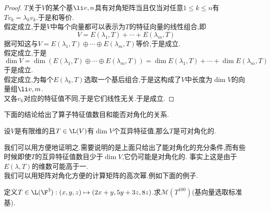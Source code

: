 \documentclass{ctexart}
\begin{document}
\begin{proof}
    $T$关于$V$的某个基$\li v,n$具有对角矩阵当且仅当对任意$1\leqslant k\leqslant n$有$Tv_k=\lambda_kv_k$.于是和等价.\\
    假定成立,于是$V$中每个向量都可以表示为$T$的特征向量的线性组合,即
    $$V=E(\lambda_1,T)+\cdots+E(\lambda_m,T)$$
    据可知这与$V=E(\lambda_1,T)\oplus\cdots\oplus E(\lambda_m,T)$等价,于是成立.\\
    假定成立,于是
    $$\dim V=\dim(E(\lambda_1,T)\oplus\cdots\oplus E(\lambda_m,T))=\dim E(\lambda_1,T)+\cdots+\dim E(\lambda_m,T)$$
    于是成立.\\
    假定成立,为每个$E(\lambda_k,T)$选取一个基后组合,于是这构成了$V$中长度为$\dim V$的向量组$\li v,m$.\\
    又各$v_k$对应的特征值不同,于是它们线性无关.于是成立.
\end{proof}\noindent
下面的结论给出了算子特征值数目和能否对角化的关系.
\begin{formal}[2.2 特征值数目与对角化]
    设$V$是有限维的且$T\in\L(V)$有$\dim V$个互异特征值,那么$T$是可对角化的.
\end{formal}\noindent
我们可以用方便地证明之.需要说明的是上面只给出了能对角化的充分条件,而有些时候即使$T$的互异特征值数目少于$\dim V$,它仍可能是对角化的.%
事实上这是由于$E(\lambda,T)$的维数可能高于一.\\
我们可以用矩阵对角化方便的计算矩阵的高次幂.例如下面的例子.
\begin{problem}[2.3 矩阵高次幂的计算]
    定义$T\in\L(\F^3):(x,y,z)\mapsto(2x+y,5y+3z,8z)$.求$\mathcal{M}\left(T^{100}\right)$(基向量选取标准基).
\end{problem}
\end{document}
